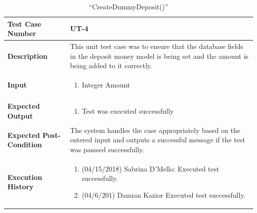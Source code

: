 \documentclass[12pt]{article}
\begin{document}
\begin{table}[H]
\caption{“CreateDummyDeposit()”}
\begin{center}
\begin{tabular}{|p{5.5cm}|p{11cm}|}
  \hline
  \bf Test Case Number & UT-4\\\hline
  \bf Description & 
This unit test case was to ensure that the database fields in the deposit money model is being set and the amount is being added to it correctly.\\\hline
  \bf Input &
  \begin{enumerate}
  \item Integer Amount
  \end{enumerate}
  \\\hline
  \bf Expected Output &
  \begin{enumerate}
  \item Test was executed successfully
  \end{enumerate}
  \\\hline
  \bf Expected Post-Condition & 
  The system handles the case appropriately based on the entered input and outputs a successful message if the test was passsed successfully.
  \\\hline   
  \bf Execution History & 
  \begin{enumerate}
  \item (04/15/2018) Sabrina D’Mello: Executed test successfully.
  \item (04/6/201) Damian Kazior Executed test successfully.
  \end{enumerate}
  \\\hline
\end{tabular}
\end{center}
\end{table}
\end{document}

